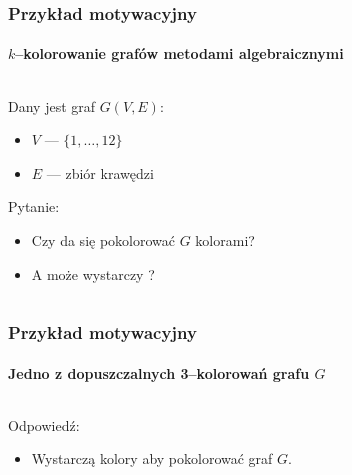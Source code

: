 \documentclass{beamer}
\begin{document}
\begin{frame}
    \frametitle{Przykład motywacyjny}
    \framesubtitle{$k$--kolorowanie grafów metodami algebraicznymi}

    \begin{columns}
        \begin{column}[l]{0.5\textwidth}
            Dany jest graf $G(V,E)$:
                \begin{itemize}
                    \item $V$ --- $\{ 1, \ldots, 12 \}$
                    \item $E$ --- zbiór krawędzi
                \end{itemize}
            \pause
            Pytanie:
            \begin{itemize}
                \item Czy da się pokolorować $G$  kolorami?
                \pause
                \item A może wystarczy ?
            \end{itemize}
        \end{column}
        \begin{column}[r]{0.4\textwidth}
            \begin{center}
                
            \end{center}
        \end{column}
    \end{columns}
\end{frame}

\begin{frame}
    \frametitle{Przykład motywacyjny}
    \framesubtitle{Jedno z dopuszczalnych 3--kolorowań grafu $G$}

    \begin{columns}
        \begin{column}[l]{0.5\textwidth}
            Odpowiedź:
                \begin{itemize}
                    \item Wystarczą  kolory \newline aby pokolorować graf $G$.
                \end{itemize}
        \end{column}
        \begin{column}[r]{0.4\textwidth}
            \begin{center}
                
            \end{center}
        \end{column}
    \end{columns}
\end{frame}
\end{document}
